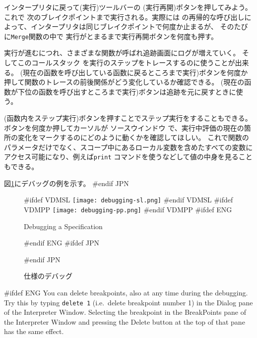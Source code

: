 \documentclass[\pformat,12pt]{article}
\newcommand{\aaa}{\tt }
\newcommand{\cmd}{\tt }
\newcommand{\guicmd}[1]{{\sf #1}}
\newcommand{\guicmd}[1]{{\gt #1}}
\begin{document}
インタープリタに戻って(\guicmd{実行})ツールバーの
(\guicmd{実行再開})ボタンを押してみよう。これで
次のブレイクポイントまで実行される。実際には
\ifthenelse{\boolean{VDMsl}}{{\aaa MergeSort}}{{\aaa Sort}}
の再帰的な呼び出しによって、インタープリタは同じブレイクポイントで何度か止まるが、
そのたびに{\tt Merge}関数の中で
実行がとまるまで\guicmd{実行再開}ボタンを何度も押す。

実行が進むにつれ、さまざまな関数が呼ばれ\guicmd{追跡}画面にログが増えていく。
そしてこのコールスタック を実行のステップをトレースするのに使うことが出来る。 
(\guicmd{現在の函数を呼び出している函数に戻るところまで実行})ボタンを何度か押して関数のトレースの前後関係がどう変化しているか確認できる。 
(\guicmd{現在の函数が下位の函数を呼び出すところまで実行})ボタンは追跡を元に戻すときに使う。

(\guicmd{函数内をステップ実行})ボタンを押すことでステップ実行をすることもできる。ボタンを何度か押してカーソルが
\guicmd{ソースウインドウ} で、実行中評価の現在の箇所の変化をマークするのにどのように動くかを確認してほしい。
これで関数のパラメータだけでなく、スコープ中にあるローカル変数を含めたすべての変数に
アクセス可能になり、例えば{\cmd print} コマンドを使うなどして値の中身を見ることもできる。

図\ref{fig:guidebug}にデバッグの例を示す。
#endif JPN

\begin{figure}[tbh]
\begin{center}
#ifdef VDMSL
\texttt{[image: debugging-sl.png]}
#endif VDMSL
#ifdef VDMPP
\texttt{[image: debugging-pp.png]}
#endif VDMPP
#ifdef ENG
\caption{Debugging a Specification}
#endif ENG
#ifdef JPN
\caption{仕様のデバッグ}
#endif JPN

\label{fig:guidebug}
\end{center}
\end{figure}

#ifdef ENG
You can delete breakpoints, also at any time during the
debugging. Try this by typing 
{\tt delete 1} (i.e.\ delete breakpoint number 1) in the
\guicmd{Dialog} pane of the \guicmd{Interpreter Window}. Selecting the
breakpoint in the \guicmd{BreakPoints} pane of the \guicmd{Interpreter
  Window} and pressing the \guicmd{Delete} button at the top of that
pane has the same effect.
\end{document}
